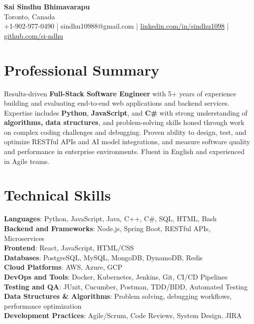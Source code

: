 \documentclass[letterpaper,11pt]{article}
\begin{document}
\begin{center}
  {\Large \textbf{Sai Sindhu Bhimavarapu}} \\
  Toronto, Canada \\
  +1-902-977-0490 \enspace | \enspace sindhu10988@gmail.com \enspace | \enspace \href{https://www.linkedin.com/in/sindhu1098/}{linkedin.com/in/sindhu1098} \enspace | \enspace \href{https://github.com/si-ndhu}{github.com/si-ndhu}
\end{center}

\section{Professional Summary}
  \begin{itemize}[leftmargin=0.15in, label={}]
    \small{\item{
     Results-driven \textbf{Full-Stack Software Engineer} with 5+ years of experience building and evaluating end-to-end web applications and backend services. Expertise includes \textbf{Python}, \textbf{JavaScript}, and \textbf{C\#} with strong understanding of \textbf{algorithms, data structures}, and problem-solving skills honed through work on complex coding challenges and debugging. Proven ability to design, test, and optimize RESTful APIs and AI model integrations, and measure software quality and performance in enterprise environments. Fluent in English and experienced in Agile teams.
    }}
  \end{itemize}
\vspace{-16pt}

\section{Technical Skills}
 \begin{itemize}[leftmargin=0.15in, label={}]
    \small{\item{
     \textbf{Languages}: Python, JavaScript, Java, C++, C\#, SQL, HTML, Bash \\
     \textbf{Backend and Frameworks}: Node.js, Spring Boot, RESTful APIs, Microservices \\
     \textbf{Frontend}: React, JavaScript, HTML/CSS \\
     \textbf{Databases}: PostgreSQL, MySQL, MongoDB, DynamoDB, Redis \\
     \textbf{Cloud Platforms}: AWS, Azure, GCP \\
     \textbf{DevOps and Tools}: Docker, Kubernetes, Jenkins, Git, CI/CD Pipelines \\
     \textbf{Testing and QA}: JUnit, Cucumber, Postman, TDD/BDD, Automated Testing \\
     \textbf{Data Structures \& Algorithms}: Problem solving, debugging workflows, performance optimization \\
     \textbf{Development Practices}: Agile/Scrum, Code Reviews, System Design, JIRA
    }}
 \end{itemize}
\vspace{-16pt}
\end{document}
